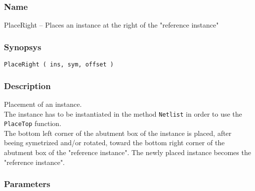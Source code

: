 \subsubsection{Name}

PlaceRight -- Places an instance at the right of the "reference instance"

\subsubsection{Synopsys}

\begin{verbatim}
PlaceRight ( ins, sym, offset )
\end{verbatim}

\subsubsection{Description}

Placement of an instance.\\
\indent The instance has to be instantiated in the method \verb-Netlist- in order to use the \verb-PlaceTop- function.\\
    
\indent The bottom left corner of the abutment box of the instance is placed, after beeing symetrized and/or rotated, toward the bottom right corner of the abutment box of the "reference instance". The newly placed instance becomes the "reference instance".

\subsubsection{Parameters}

